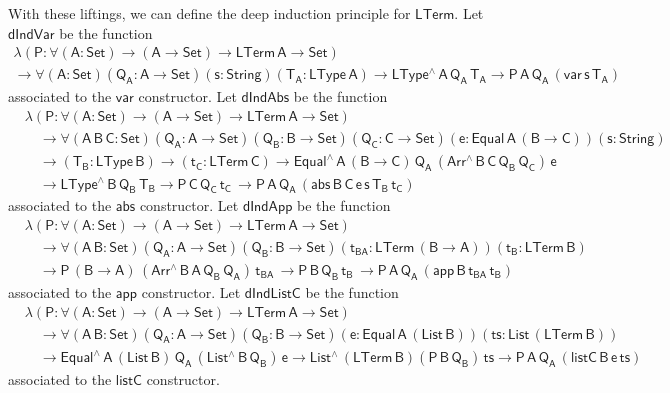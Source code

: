 \documentclass[9pt]{entcs}
\begin{document}
With these liftings, we can define the deep induction principle for $\mathsf{LTerm}$.
Let $\mathsf{dIndVar}$ be the function 
\begin{multline*}
\mathsf{\lambda (P : \forall (A : Set) \to (A \to Set) \to LTerm\,A \to Set)} \\
\mathsf{\to 
  \forall (A : Set) (Q_A : A \to Set) (s : String) (T_A : LType\, A) 
  \to LType^{\wedge} \, A\, Q_A\, T_A
  \to P \, A\, Q_A\, (var \, s\, T_A)
  }
\end{multline*}
associated to the $\mathsf{var}$ constructor. 
Let $\mathsf{dIndAbs}$ be the function 
\begin{align*}
  &\mathsf{\lambda (P : \forall (A : Set) \to (A \to Set) \to LTerm\,A \to Set)} \\
  &\quad\mathsf{\to 
  \forall (A\,B\,C: Set) (Q_A : A \to Set)  (Q_B : B \to Set) (Q_C : C \to Set)
  (e : Equal\, A\, (B \to C)) (s : String) } \\ 
  &\quad\mathsf{ \to (T_B : LType\, B) \to (t_C : LTerm\, C)
  \to Equal^{\wedge}\,A\,(B \to C)\, Q_A \, (Arr^{\wedge} \, B\, C\, Q_B \, Q_C) \, e
  } \\
  &\quad\mathsf{
  \to LType^{\wedge}\, B\, Q_B\, T_B
  \to P\, C\, Q_C\, t_C\, 
  \to P \, A\, Q_A\, (abs \,B \,C \, e \,s \,T_B \, t_C)
  }
\end{align*}
associated to the $\mathsf{abs}$ constructor. 
Let $\mathsf{dIndApp}$ be the function 
\begin{align*}
  &\mathsf{\lambda (P : \forall (A : Set) \to (A \to Set) \to LTerm\,A \to Set)} \\
  &\quad \mathsf{\to 
  \forall (A \,B : Set) (Q_A : A \to Set)  (Q_B : B \to Set) 
   (t_{BA} : LTerm\, (B \to A)) (t_B : LTerm\, B)} \\
  &\quad \mathsf{
  \to P\, (B \to A)\, (Arr^{\wedge} \, B\, A\, Q_B \, Q_A) \, t_{BA} \, 
  \to P\, B\, Q_B\, t_B\, 
  \to P \, A\, Q_A\, (app \,B \,t_{BA} \, t_B) }
\end{align*}
associated to the $\mathsf{app}$ constructor. 
Let $\mathsf{dIndListC}$ be the function 
\begin{align*}
  &\mathsf{\lambda (P : \forall (A : Set) \to (A \to Set) \to LTerm\,A \to Set)} \\
  &\quad \mathsf{\to 
  \forall (A \,B : Set) (Q_A : A \to Set)  (Q_B : B \to Set) 
    (e : Equal\, A\, (List\, B)) (ts : List\, (LTerm\, B))} \\ 
  &\quad \mathsf{
    \to Equal^{\wedge}\, A\, (List\,B)\, Q_A\, (List^{\wedge}\, B\, Q_B)\, e 
  \to List^{\wedge}\, (LTerm\,B) (P\, B\, Q_B)\, ts
  \to P \, A\, Q_A\, (listC \,B \,e \, ts) }
\end{align*}
associated to the $\mathsf{listC}$ constructor.
\end{document}
